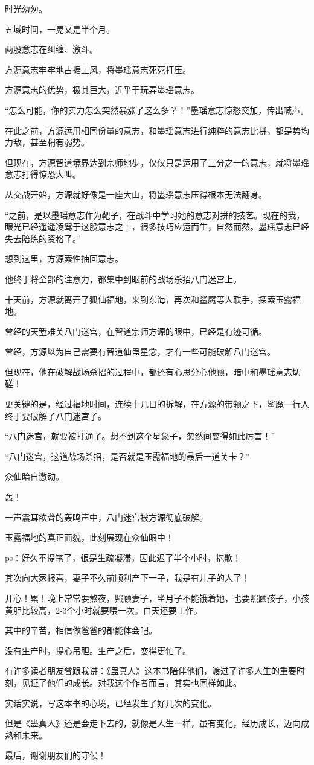 \begin{this_body}
时光匆匆。

五域时间，一晃又是半个月。

两股意志在纠缠、激斗。

方源意志牢牢地占据上风，将墨瑶意志死死打压。

方源意志的优势，极其巨大，近乎于玩弄墨瑶意志。

“怎么可能，你的实力怎么突然暴涨了这么多？！”墨瑶意志惊怒交加，传出喊声。

在此之前，方源运用相同份量的意志，和墨瑶意志进行纯粹的意志比拼，都是势均力敌，甚至稍有弱势。

但现在，方源智道境界达到宗师地步，仅仅只是运用了三分之一的意志，就将墨瑶意志打得惊恐大叫。

从交战开始，方源就好像是一座大山，将墨瑶意志压得根本无法翻身。

“之前，是以墨瑶意志作为靶子，在战斗中学习她的意志对拼的技艺。现在的我，眼光已经遥遥凌驾于这股意志之上，很多技巧应运而生，自然而然。墨瑶意志已经失去陪练的资格了。”

想到这里，方源索性抽回意志。

他终于将全部的注意力，都集中到眼前的战场杀招八门迷宫上。

十天前，方源就离开了狐仙福地，来到东海，再次和鲨魔等人联手，探索玉露福地。

曾经的天堑难关八门迷宫，在智道宗师方源的眼中，已经是有迹可循。

曾经，方源以为自己需要有智道仙蛊星念，才有一些可能破解八门迷宫。

但现在，他在破解战场杀招的过程中，都还有心思分心他顾，暗中和墨瑶意志切磋！

更关键的是，经过福地时间，连续十几日的拆解，在方源的带领之下，鲨魔一行人终于要破解了八门迷宫了。

“八门迷宫，就要被打通了。想不到这个星象子，忽然间变得如此厉害！”

“八门迷宫，这道战场杀招，是否就是玉露福地的最后一道关卡？”

众仙暗自激动。

轰！

一声震耳欲聋的轰鸣声中，八门迷宫被方源彻底破解。

玉露福地的真正面貌，此刻展现在众仙眼中！

ps：好久不提笔了，很是生疏凝滞，因此迟了半个小时，抱歉！

其次向大家报喜，妻子不久前顺利产下一子，我是有儿子的人了！

开心！累！晚上常常要熬夜，照顾妻子，坐月子不能饿着她，也要照顾孩子，小孩黄胆比较高，2-3个小时就要喂一次。白天还要工作。

其中的辛苦，相信做爸爸的都能体会吧。

没有生产时，提心吊胆。生产之后，变得更忙了。

有许多读者朋友曾跟我讲：《蛊真人》这本书陪伴他们，渡过了许多人生的重要时刻，见证了他们的成长。对我这个作者而言，其实也同样如此。

实话实说，写这本书的心境，已经发生了好几次的变化。

但是《蛊真人》还是会走下去的，就像是人生一样，虽有变化，经历成长，迈向成熟和未来。

最后，谢谢朋友们的守候！

\end{this_body}


